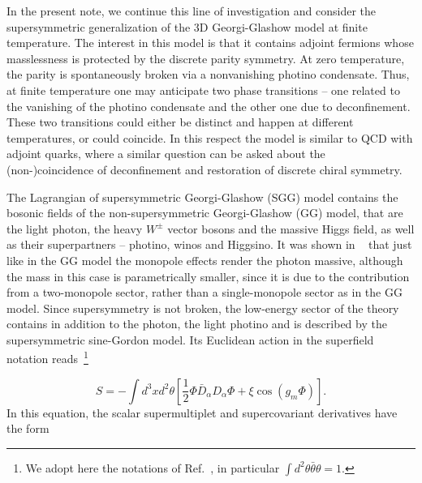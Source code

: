 \documentclass[a4paper,12pt]{article}
\begin{document}
In the present note, we continue this line of investigation and consider
the supersymmetric generalization of the 3D Georgi-Glashow model
at finite temperature. The interest in this model is that it
contains adjoint fermions whose masslessness is protected by the
discrete parity symmetry. At zero temperature, the parity is
spontaneously broken via a nonvanishing photino condensate. Thus,
at finite temperature one may anticipate two phase transitions --
one related to the vanishing of the photino condensate and the
other one due to deconfinement. These two transitions could either
be distinct and happen at different temperatures, or could
coincide. In this respect the model is similar to QCD with adjoint
quarks, where a similar question can be asked about the
(non-)coincidence of deconfinement and restoration of discrete
chiral symmetry.



The Lagrangian of supersymmetric Georgi-Glashow (SGG) model
contains the bosonic fields of the non-supersymmetric
Georgi-Glashow (GG) model, that are the light photon, the heavy
$W^\pm$ vector bosons and the massive Higgs field, as well as
their superpartners -- photino, winos and Higgsino. It was shown
in ~\cite{ahw} that just like in the GG model the monopole effects
render the photon massive, although the mass in this case is
parametrically smaller, since it is due to the contribution from a
two-monopole sector, rather than a single-monopole sector as in
the GG model. Since supersymmetry is not broken, the low-energy
sector of the theory contains in addition to the photon, the light
photino and is described by the supersymmetric sine-Gordon model.
Its Euclidean action in the superfield notation reads~\footnote{We
adopt here the notations of Ref.~\cite{MZ}, in particular $\int
d^2\theta\bar\theta\theta=1$.}


\begin{equation}
\label{0}
S=-\int d^3xd^2\theta\left[\frac12\Phi\bar D_\alpha D_\alpha\Phi+\xi
\cos\left(g_m\Phi\right)\right].
\end{equation}
In this equation, the scalar supermultiplet and supercovariant
derivatives have the form
\end{document}
